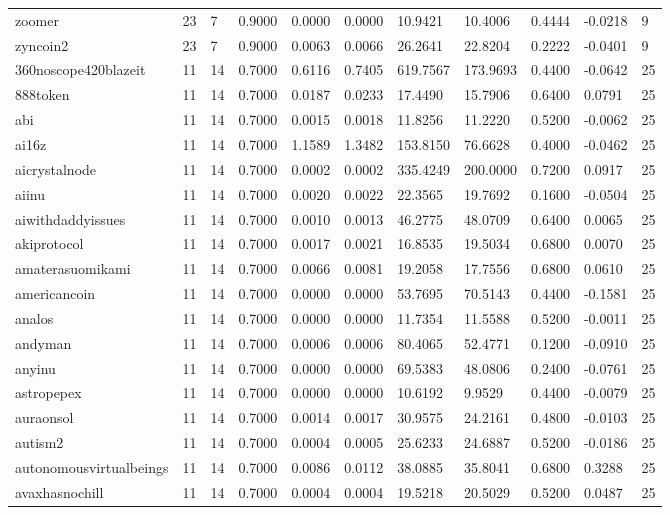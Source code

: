 \begin{table}[htbp]
\begin{tabular}{lllllllllll}
zoomer & 23 & 7 & 0.9000 & 0.0000 & 0.0000 & 10.9421 & 10.4006 & 0.4444 & -0.0218 & 9 \\
zyncoin2 & 23 & 7 & 0.9000 & 0.0063 & 0.0066 & 26.2641 & 22.8204 & 0.2222 & -0.0401 & 9 \\
360noscope420blazeit & 11 & 14 & 0.7000 & 0.6116 & 0.7405 & 619.7567 & 173.9693 & 0.4400 & -0.0642 & 25 \\
888token & 11 & 14 & 0.7000 & 0.0187 & 0.0233 & 17.4490 & 15.7906 & 0.6400 & 0.0791 & 25 \\
abi & 11 & 14 & 0.7000 & 0.0015 & 0.0018 & 11.8256 & 11.2220 & 0.5200 & -0.0062 & 25 \\
ai16z & 11 & 14 & 0.7000 & 1.1589 & 1.3482 & 153.8150 & 76.6628 & 0.4000 & -0.0462 & 25 \\
aicrystalnode & 11 & 14 & 0.7000 & 0.0002 & 0.0002 & 335.4249 & 200.0000 & 0.7200 & 0.0917 & 25 \\
aiinu & 11 & 14 & 0.7000 & 0.0020 & 0.0022 & 22.3565 & 19.7692 & 0.1600 & -0.0504 & 25 \\
aiwithdaddyissues & 11 & 14 & 0.7000 & 0.0010 & 0.0013 & 46.2775 & 48.0709 & 0.6400 & 0.0065 & 25 \\
akiprotocol & 11 & 14 & 0.7000 & 0.0017 & 0.0021 & 16.8535 & 19.5034 & 0.6800 & 0.0070 & 25 \\
amaterasuomikami & 11 & 14 & 0.7000 & 0.0066 & 0.0081 & 19.2058 & 17.7556 & 0.6800 & 0.0610 & 25 \\
americancoin & 11 & 14 & 0.7000 & 0.0000 & 0.0000 & 53.7695 & 70.5143 & 0.4400 & -0.1581 & 25 \\
analos & 11 & 14 & 0.7000 & 0.0000 & 0.0000 & 11.7354 & 11.5588 & 0.5200 & -0.0011 & 25 \\
andyman & 11 & 14 & 0.7000 & 0.0006 & 0.0006 & 80.4065 & 52.4771 & 0.1200 & -0.0910 & 25 \\
anyinu & 11 & 14 & 0.7000 & 0.0000 & 0.0000 & 69.5383 & 48.0806 & 0.2400 & -0.0761 & 25 \\
astropepex & 11 & 14 & 0.7000 & 0.0000 & 0.0000 & 10.6192 & 9.9529 & 0.4400 & -0.0079 & 25 \\
auraonsol & 11 & 14 & 0.7000 & 0.0014 & 0.0017 & 30.9575 & 24.2161 & 0.4800 & -0.0103 & 25 \\
autism2 & 11 & 14 & 0.7000 & 0.0004 & 0.0005 & 25.6233 & 24.6887 & 0.5200 & -0.0186 & 25 \\
autonomousvirtualbeings & 11 & 14 & 0.7000 & 0.0086 & 0.0112 & 38.0885 & 35.8041 & 0.6800 & 0.3288 & 25 \\
avaxhasnochill & 11 & 14 & 0.7000 & 0.0004 & 0.0004 & 19.5218 & 20.5029 & 0.5200 & 0.0487 & 25 \\

\end{tabular}
\end{table}
